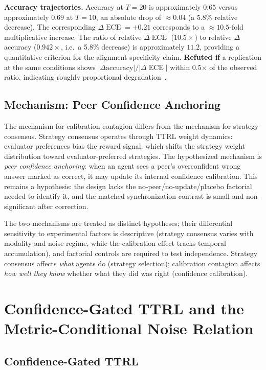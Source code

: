 \documentclass[11pt]{article}
\DeclareMathOperator{\ECE}{ECE}
\begin{document}
\textbf{Accuracy trajectories.} Accuracy at $T{=}20$ is approximately $0.65$ versus approximately $0.69$ at $T{=}10$, an absolute drop of $\approx 0.04$ (a 5.8\% relative decrease). The corresponding $\Delta\ECE = +0.21$ corresponds to a $\approx 10.5$-fold multiplicative increase. The ratio of relative $\Delta\ECE$ ($10.5\times$) to relative $\Delta$accuracy ($0.942\times$, i.e.\ a 5.8\% decrease) is approximately $11.2$, providing a quantitative criterion for the alignment-specificity claim. \textbf{Refuted if} a replication at the same conditions shows $|\Delta\text{accuracy}|/|\Delta\ECE|$ within 0.5$\times$ of the observed ratio, indicating roughly proportional degradation~\citep{dodge2019show}.

\subsection{Mechanism: Peer Confidence Anchoring}

The mechanism for calibration contagion differs from the mechanism for strategy consensus. Strategy consensus operates through TTRL weight dynamics: evaluator preferences bias the reward signal, which shifts the strategy weight distribution toward evaluator-preferred strategies. The hypothesized mechanism is \textit{peer confidence anchoring}: when an agent sees a peer's overconfident wrong answer marked as correct, it may update its internal confidence calibration. This remains a hypothesis: the design lacks the no-peer/no-update/placebo factorial needed to identify it, and the matched synchronization contrast is small and non-significant after correction.

The two mechanisms are treated as distinct hypotheses; their differential sensitivity to experimental factors is descriptive (strategy consensus varies with modality and noise regime, while the calibration effect tracks temporal accumulation), and factorial controls are required to test independence. Strategy consensus affects \textit{what} agents do (strategy selection); calibration contagion affects \textit{how well they know} whether what they did was right (confidence calibration).

\section{Confidence-Gated TTRL and the Metric-Conditional Noise Relation}

\subsection{Confidence-Gated TTRL}
\end{document}
